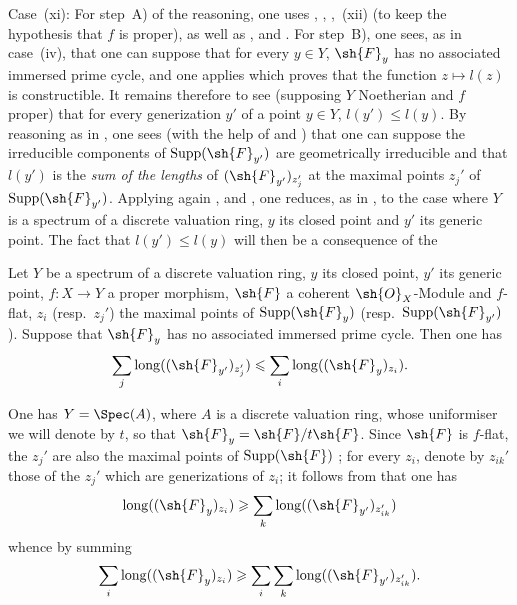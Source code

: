 \begin{env}[12.2.1.3]
\label{IV.12.2.1.3}
Case~(xi): For step~A) of the reasoning, one uses , , ,~(xii) (to keep the hypothesis that $f$ is proper), as well as ,  and .
For step~B), one sees, as in case~(iv), that one can suppose that for every $y\in Y$, $\sh{F}_y$ has no associated immersed prime cycle, and one applies  which proves that the function $z\mapsto l(z)$ is constructible.
It remains therefore to see (supposing $Y$ Noetherian and $f$ proper) that for every generization $y'$ of a point $y\in Y$, $l(y')\leqslant l(y)$.
By reasoning as in , one sees (with the help of  and ) that one can suppose the irreducible components of $\operatorname{Supp}(\sh{F}_{y'})$ are geometrically irreducible and that $l(y')$ is the \emph{sum of the lengths} of $(\sh{F}_{y'})_{z_j'}$ at the maximal points $z_j'$ of $\operatorname{Supp}(\sh{F}_{y'})$.
Applying again ,  and , one reduces, as in , to the case where $Y$ is a spectrum of a discrete valuation ring, $y$ its closed point and $y'$ its generic point.
The fact that $l(y')\leqslant l(y)$ will then be a consequence of the

\begin{lemma}[12.2.1.4]
\label{IV.12.2.1.4}
Let $Y$ be a spectrum of a discrete valuation ring, $y$ its closed point, $y'$ its generic point, $f:X\to Y$ a proper morphism, $\sh{F}$ a coherent $\sh{O}_X$-Module and $f$-flat, $z_i$ \textnormal{(}resp.\ $z_j'$\textnormal{)} the maximal points of $\operatorname{Supp}(\sh{F}_y)$ \textnormal{(}resp.\ $\operatorname{Supp}(\sh{F}_{y'})$\textnormal{)}.
Suppose that $\sh{F}_y$ has no associated immersed prime cycle.
Then one has
\[
  \sum_j \operatorname{long}((\sh{F}_{y'})_{z_j'}) \leqslant \sum_i \operatorname{long}((\sh{F}_y)_{z_i}).
\]
\end{lemma}

One has $Y=\Spec(A)$, where $A$ is a discrete valuation ring, whose uniformiser we will denote by $t$, so that $\sh{F}_y=\sh{F}/t\sh{F}$.
Since $\sh{F}$ is $f$-flat, the $z_j'$ are also the maximal points of $\operatorname{Supp}(\sh{F})$ ; for every $z_i$, denote by $z_{ik}'$ those of the $z_j'$ which are generizations of $z_i$; it follows from  that one has
\[
  \operatorname{long}((\sh{F}_y)_{z_i}) \geqslant \sum_k \operatorname{long}((\sh{F}_{y'})_{z_{ik}'})
\]
whence by summing
\[
  \sum_i \operatorname{long}((\sh{F}_y)_{z_i}) \geqslant \sum_i \sum_k \operatorname{long}((\sh{F}_{y'})_{z_{ik}'}).
\]


\end{env}
